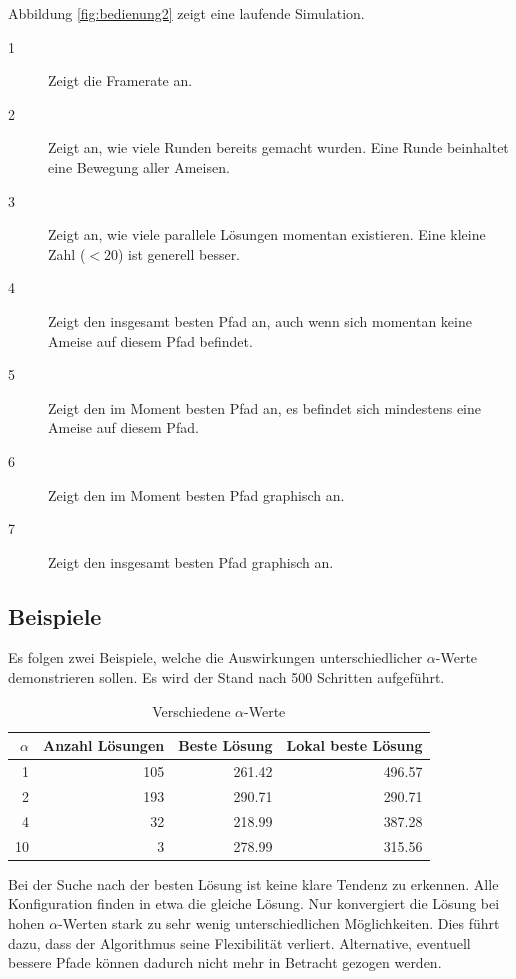 Abbildung \ref{fig:bedienung2} zeigt eine laufende Simulation.

\begin{description}
\item[1] Zeigt die Framerate an. 
\item[2] Zeigt an, wie viele Runden bereits gemacht wurden. Eine Runde
beinhaltet eine Bewegung aller Ameisen.
\item[3] Zeigt an, wie viele parallele Lösungen momentan existieren. Eine kleine
Zahl ($<20$) ist generell besser.
\item[4] Zeigt den insgesamt besten Pfad an, auch wenn sich momentan keine
Ameise auf diesem Pfad befindet.
\item[5] Zeigt den im Moment besten Pfad an, es befindet sich mindestens eine
Ameise auf diesem Pfad.
\item[6] Zeigt den im Moment besten Pfad graphisch an.
\item[7] Zeigt den insgesamt besten Pfad graphisch an.
\end{description}

\subsection{Beispiele}

Es folgen zwei Beispiele, welche die Auswirkungen unterschiedlicher
$\alpha$-Werte demonstrieren sollen. Es wird der Stand nach 500 Schritten
aufgeführt.

\begin{table}[H] 
\begin{tabular}{ | r | r | r | r | } 
\hline $\alpha$ & Anzahl Lösungen & Beste Lösung & Lokal beste Lösung  \\ 
\hline 1 & 105 & 261.42 & 496.57 \\ 
\hline 2 & 193 & 290.71 & 290.71  \\ 
\hline 4 & 32 & 218.99 & 387.28  \\ 
\hline 10 & 3 & 278.99 & 315.56  \\ 
\hline \end{tabular}
\caption{Verschiedene $\alpha$-Werte} 
\end{table}

Bei der Suche nach der besten Lösung ist keine klare Tendenz zu erkennen. Alle 
Konfiguration finden in etwa die gleiche Lösung. Nur konvergiert die Lösung bei 
hohen $\alpha$-Werten stark zu sehr wenig unterschiedlichen Möglichkeiten. Dies 
führt dazu, dass der Algorithmus seine Flexibilität verliert. Alternative,
eventuell bessere Pfade können dadurch nicht mehr in Betracht gezogen werden.

